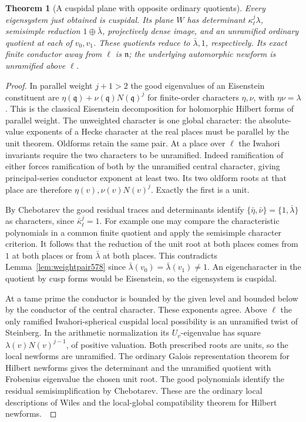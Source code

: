 \documentclass[a4paper,11pt]{article}
\newtheorem{theorem}[proposition]{Theorem}
\theoremstyle{definition}
\theoremstyle{remark}
\numberwithin{equation}{section}
\begin{document}
\begin{theorem}[A cuspidal plane with opposite ordinary quotients]
\leavevmode\label{thm:mixedplane578}
Every eigensystem just obtained is cuspidal. Its plane \(W\)
has determinant \(\kappa_\ell^j\lambda\), semisimple
reduction \(1\oplus\bar\lambda\), projectively dense image,
and an unramified ordinary quotient at each of \(v_0,v_1\).
These quotients reduce to \(\bar\lambda,1\), respectively.
Its exact finite conductor away from \(\ell\) is
\(\mathfrak n\); the underlying automorphic newform is
unramified above \(\ell\).
\end{theorem}
\begin{proof}
In parallel weight \(j+1>2\) the good eigenvalues of an
Eisenstein constituent are
\(\eta(\mathfrak q)+\nu(\mathfrak q)N(\mathfrak q)^j\)
for finite-order characters \(\eta,\nu\), with
\(\eta\nu=\lambda\). This is the classical Eisenstein
decomposition for holomorphic Hilbert forms of parallel
weight. The unweighted character is one global character:
the absolute-value exponents of a Hecke character at the
real places must be parallel by the unit theorem. Oldforms
retain the same pair. At a place over \(\ell\) the Iwahori
invariants require the two characters to be unramified.
Indeed ramification of either forces ramification of both
by the unramified central character, giving principal-series
conductor exponent at least two. Its two oldform roots at
that place are therefore \(\eta(v),\nu(v)N(v)^j\).
Exactly the first is a unit.

By Chebotarev the good residual traces and determinants
identify \(\{\bar\eta,\bar\nu\}=\{1,\bar\lambda\}\) as
characters, since \(\bar\kappa_\ell^j=1\). For example one
may compare the characteristic polynomials in a common finite
quotient and apply the semisimple character criterion.
It follows that the reduction of the unit root at both
places comes from \(1\) at both places or from
\(\bar\lambda\) at both places. This contradicts
Lemma~\ref{lem:weightpair578} since
\(\bar\lambda(v_0)=\bar\lambda(v_1)\ne1\).
An eigencharacter in the quotient by cusp forms would be
Eisenstein, so the eigensystem is cuspidal.

At a tame prime the conductor is bounded by the given level
and bounded below by the conductor of the central character.
These exponents agree. Above \(\ell\) the only ramified
Iwahori-spherical cuspidal local possibility is an unramified
twist of Steinberg. In the arithmetic normalization its
\(U_v\)-eigenvalue has square
\(\lambda(v)N(v)^{j-1}\), of positive valuation. Both
prescribed roots are units, so the local newforms are
unramified. The ordinary Galois representation theorem for
Hilbert newforms gives the determinant and the unramified
quotient with Frobenius eigenvalue the chosen unit root.
The good polynomials identify the residual semisimplification
by Chebotarev. These are the ordinary local descriptions
of Wiles and the local-global compatibility theorem for
Hilbert newforms.~\cite{XII-IX-VI-saito40}


\end{proof}
\end{document}
